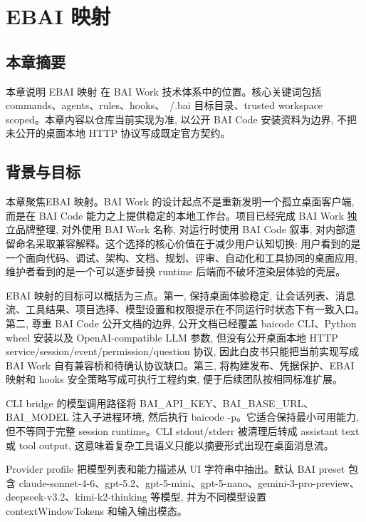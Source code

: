\chapter{EBAI 映射}
\section{本章摘要}
本章说明 EBAI 映射 在 BAI Work 技术体系中的位置。核心关键词包括 commands、agents、rules、hooks、~/.bai 目标目录、trusted workspace scoped。本章内容以仓库当前实现为准, 以公开 BAI Code 安装资料为边界, 不把未公开的桌面本地 HTTP 协议写成既定官方契约。

\section{背景与目标}
本章聚焦EBAI 映射。BAI Work 的设计起点不是重新发明一个孤立桌面客户端, 而是在 BAI Code 能力之上提供稳定的本地工作台。项目已经完成 BAI Work 独立品牌整理, 对外使用 BAI Work 名称, 对运行时使用 BAI Code 叙事, 对内部遗留命名采取兼容解释。这个选择的核心价值在于减少用户认知切换: 用户看到的是一个面向代码、调试、架构、文档、规划、评审、自动化和工具协同的桌面应用, 维护者看到的是一个可以逐步替换 runtime 后端而不破坏渲染层体验的壳层。

EBAI 映射的目标可以概括为三点。第一, 保持桌面体验稳定, 让会话列表、消息流、工具结果、项目选择、模型设置和权限提示在不同运行时状态下有一致入口。第二, 尊重 BAI Code 公开文档的边界, 公开文档已经覆盖 baicode CLI、Python wheel 安装以及 OpenAI-compatible LLM 参数, 但没有公开桌面本地 HTTP service/session/event/permission/question 协议, 因此白皮书只能把当前实现写成 BAI Work 自有兼容桥和待确认协议缺口。第三, 将构建发布、凭据保护、EBAI 映射和 hooks 安全策略写成可执行工程约束, 便于后续团队按相同标准扩展。

CLI bridge 的模型调用路径将 BAI\_API\_KEY、BAI\_BASE\_URL、BAI\_MODEL 注入子进程环境, 然后执行 baicode -p。它适合保持最小可用能力, 但不等同于完整 session runtime。CLI stdout/stderr 被清理后转成 assistant text 或 tool output, 这意味着复杂工具语义只能以摘要形式出现在桌面消息流。

Provider profile 把模型列表和能力描述从 UI 字符串中抽出。默认 BAI preset 包含 claude-sonnet-4-6、gpt-5.2、gpt-5-mini、gpt-5-nano、gemini-3-pro-preview、deepseek-v3.2、kimi-k2-thinking 等模型, 并为不同模型设置 contextWindowTokens 和输入输出模态。


